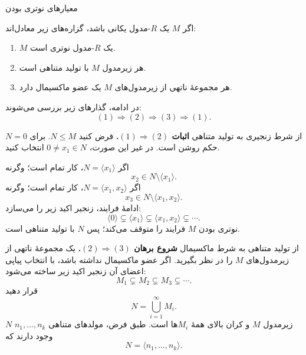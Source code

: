 \begin{frame}[t]{معیارهای نوتری بودن}
    \label{lec10:noetherian-criteria}
    \begin{theorem}
        اگر $M$ یک $R$-مدول یکانی باشد، گزاره‌های زیر معادل‌اند:
        \begin{enumerate}
            \item $M$ یک $R$-مدول نوتری است.
            \item هر زیرمدول $M$ با تولید متناهی است.
            \item هر مجموعهٔ ناتهی از زیرمدول‌های $M$ یک عضو ماکسیمال دارد.
        \end{enumerate}
    \end{theorem}
    در ادامه، گذارهای زیر بررسی می‌شوند:
    \[
        (1)\Longrightarrow(2)\Longrightarrow(3)\Longrightarrow(1).
    \]
\end{frame}

\begin{frame}[t]{از شرط زنجیری به تولید متناهی}
    \label{lec10:noetherian-finite-generation}
    \textbf{اثبات \((1)\Longrightarrow(2)\).}
    فرض کنید $N\leq M$. برای $N=0$ حکم روشن است.
    در غیر این صورت، $0\ne x_1\in N$ انتخاب کنید.

    اگر $N=\langle x_1\rangle$، کار تمام است؛ وگرنه
    \[
        x_2\in N\setminus\langle x_1\rangle.
    \]
    اگر $N=\langle x_1,x_2\rangle$، کار تمام است؛ وگرنه
    \[
        x_3\in N\setminus\langle x_1,x_2\rangle.
    \]
    ادامهٔ فرایند، زنجیر اکید زیر را می‌سازد:
    \[
        \langle0\rangle\subsetneq\langle x_1\rangle
        \subsetneq\langle x_1,x_2\rangle\subsetneq\cdots.
    \]
    نوتری بودن $M$ فرایند را متوقف می‌کند؛ پس $N$ با تولید متناهی است.
\end{frame}

\begin{frame}[t]{از تولید متناهی به شرط ماکسیمال}
    \label{lec10:noetherian-maximal-family}
    \textbf{شروع برهان \((2)\Longrightarrow(3)\).}
    یک مجموعهٔ ناتهی از زیرمدول‌های $M$ را در نظر بگیرید.
    اگر عضو ماکسیمال نداشته باشد، با انتخاب پیاپی اعضای آن
    زنجیر اکید زیر ساخته می‌شود:
    \[
        M_1\subsetneq M_2\subsetneq M_3\subsetneq\cdots.
    \]
    قرار دهید
    \[
        N=\bigcup_{i=1}^{\infty}M_i.
    \]
    $N$ زیرمدول $M$ و کران بالای همهٔ $M_i$ها است.
    طبق فرض، مولدهای متناهی $n_1,\ldots,n_k$ وجود دارند که
    \[
        N=\langle n_1,\ldots,n_k\rangle.
    \]
\end{frame}

